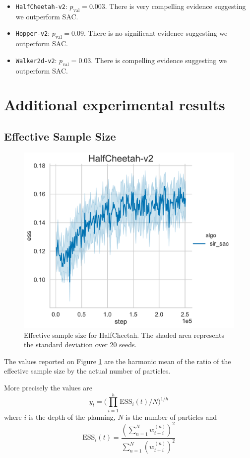 \begin{itemize}
    \item \texttt{HalfCheetah-v2}: $p_{\text{val}} = 0.003$. There is very compelling evidence suggesting we outperform SAC.
    \item \texttt{Hopper-v2}: $p_{\text{val}} = 0.09$. There is no significant evidence suggesting we outperform SAC.
    \item \texttt{Walker2d-v2}: $p_{\text{val}} = 0.03 $. There is compelling evidence suggesting we outperform SAC.
\end{itemize}

\section{Additional experimental results}
\label{app:add_results}
\subsection{Effective Sample Size}
\label{app:ess}

\begin{figure}[!h]
\centering
\includegraphics[width=0.5\linewidth]{articles/smcp/figures/HalfCheetah-v2_ess1543280008.pdf}
\caption{Effective sample size for HalfCheetah. The shaded area represents the standard deviation over 20 seeds.}
\label{fig:ess}
\end{figure}


The values reported on Figure \ref{fig:ess} are the harmonic mean of the ratio of the effective sample size by the actual number of particles.

More precisely the values are
$$y_t =  \big(\prod_{i=1}^{h} \text{ESS}_i(t) / N \big)^{1/h}$$
where $i$ is the depth of the planning, $N$ is the number of particles and 
$$\text{ESS}_i(t) = \frac{(\sum_{n=1}^N w_{t+i}^{(n)})^2}{\sum_{n=1}^N (w_{t+i}^{(n)})^2}$$ 

